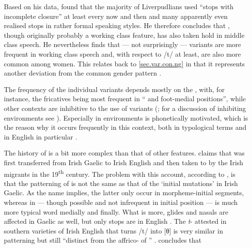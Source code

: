 Based on his \citeyear{knowles1973} data, \citeauthor{knowles1973} found that the majority of Liverpudlians used ``stops with incomplete closure'' at least every now and then and many apparently even realised  stops in rather formal speaking styles.
He therefore concludes that , though originally probably a working class feature, has also taken hold in middle class speech.
He nevertheless finds that --- not surprisingly ---  variants are more frequent in working class speech and, with respect to /t/ at least, are also more common among women.
This relates back to \ref{sec.var.con.ng} in that it represents another deviation from the common gender pattern \citeyearpar[cf.][325--327]{knowles1973}.

The frequency of the individual variants depends mostly on the , with, for instance, the fricatives being most frequent in `` and foot-medial positions'', while other contexts are inhibitive to the use of  variants (\citealp[cf.][130]{honeybone2007}; for a discussion of inhibiting environments see \citealt{honeybone2001}).
Especially in  environments  is phonetically motivated, which is the reason why it occurs frequently in this context, both in typological terms and in  English in particular \parencite[cf][230 and 243]{honeybone2001}.

The history of  is a bit more complex than that of other features.
\textcite{hickey1996} claims that  was first transferred from Irish Gaelic to Irish English and then taken to  by the Irish migrants in the 19\textsuperscript{th} century.
The problem with this account, according to \citet{honeybone2007}, is that the patterning of   is not the same as that of the `initial mutations' in Irish Gaelic.
As the name implies, the latter only occur in morpheme-initial segments, whereas  in  --- though possible and not infrequent in initial position --- is much more typical word medially and finally.
What is more, glides and nasals are affected in Gaelic as well, but only stops are  in  English \citep[cf.][131]{honeybone2007}.
The \emph{t}- attested in southern varieties of Irish English that turns /t/ into [θ] is very similar in patterning but still ``distinct from the affrico- of  '' \citep[132]{honeybone2007}.
\citeauthor{honeybone2007} concludes that

